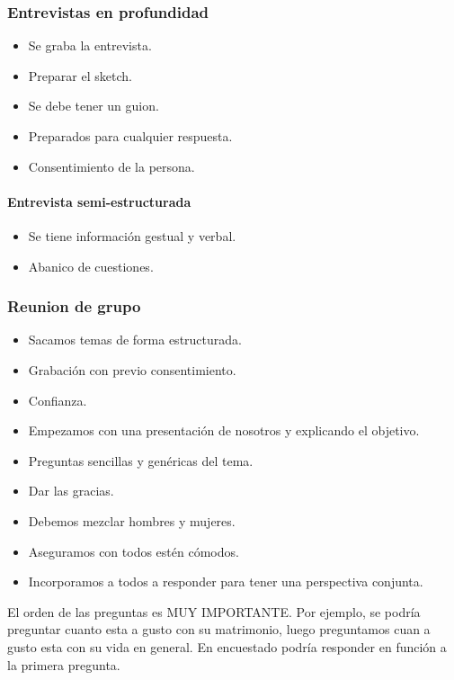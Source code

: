 \subsubsection{Entrevistas en profundidad}

\begin{itemize}
    \item Se graba la entrevista.
    \item Preparar el sketch.
    \item Se debe tener un guion.
    \item Preparados para cualquier respuesta.
    \item Consentimiento de la persona.
\end{itemize}


\paragraph{Entrevista semi-estructurada}

\begin{itemize}
    \item Se tiene información gestual y verbal.
    \item Abanico de cuestiones.
\end{itemize}

\subsubsection{Reunion de grupo}
\begin{itemize}
    \item Sacamos temas de forma estructurada.
    \item Grabación con previo consentimiento.
    \item Confianza.
    \item Empezamos con una presentación de nosotros y explicando el objetivo.
    \item Preguntas sencillas y genéricas del tema.
    \item Dar las gracias.
    \item Debemos mezclar hombres y mujeres.
    \item Aseguramos con todos estén cómodos.
    \item Incorporamos a todos a responder para tener una perspectiva conjunta.
\end{itemize}

El orden de las preguntas es MUY IMPORTANTE. Por ejemplo, se podría preguntar cuanto esta a gusto con su matrimonio, luego preguntamos cuan a gusto esta con su vida en general. En encuestado podría responder en función a la primera pregunta.


